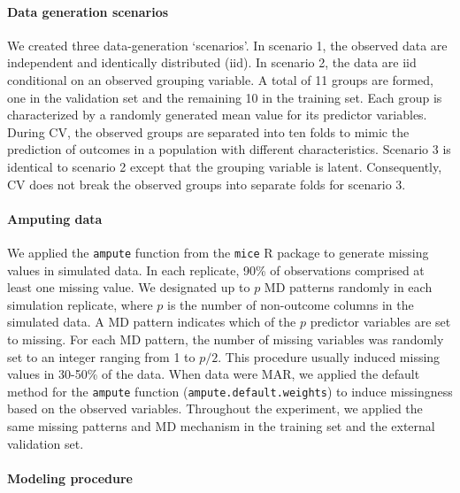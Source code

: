 \documentclass[AMA,STIX1COL,doublespace]{WileyNJD-v2}
\begin{document}
\paragraph{Data generation scenarios}

We created three data-generation `scenarios'. In scenario 1, the
observed data are independent and identically distributed (iid). In
scenario 2, the data are iid conditional on an observed grouping
variable. A total of 11 groups are formed, one in the validation set and
the remaining 10 in the training set. Each group is characterized by a
randomly generated mean value for its predictor variables. During CV,
the observed groups are separated into ten folds to mimic the prediction
of outcomes in a population with different characteristics. Scenario 3
is identical to scenario 2 except that the grouping variable is latent.
Consequently, CV does not break the observed groups into separate folds
for scenario 3.

\paragraph{Amputing data}

We applied the \texttt{ampute} function from the \texttt{mice} R package
to generate missing values in simulated data.\cite{mice} In each
replicate, 90\% of observations comprised at least one missing value. We
designated up to \(p\) MD patterns randomly in each simulation
replicate, where \(p\) is the number of non-outcome columns in the
simulated data. A MD pattern indicates which of the \(p\) predictor
variables are set to missing. For each MD pattern, the number of missing
variables was randomly set to an integer ranging from 1 to \(p/2\). This
procedure usually induced missing values in 30-50\% of the data. When
data were MAR, we applied the default method for the \texttt{ampute}
function (\texttt{ampute.default.weights}) to induce missingness based
on the observed variables. Throughout the experiment, we applied the
same missing patterns and MD mechanism in the training set and the
external validation set.

\paragraph{Modeling procedure}
\end{document}

